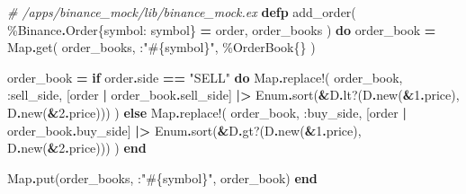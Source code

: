 \documentclass[
  oneside]{book}
\newenvironment{Shaded}{\begin{snugshade}}{\end{snugshade}}
\newcommand{\CommentTok}[1]{\textcolor[rgb]{0.56,0.35,0.01}{\textit{#1}}}
\newcommand{\ConstantTok}[1]{\textcolor[rgb]{0.00,0.00,0.00}{#1}}
\newcommand{\ControlFlowTok}[1]{\textcolor[rgb]{0.13,0.29,0.53}{\textbf{#1}}}
\newcommand{\DecValTok}[1]{\textcolor[rgb]{0.00,0.00,0.81}{#1}}
\newcommand{\KeywordTok}[1]{\textcolor[rgb]{0.13,0.29,0.53}{\textbf{#1}}}
\newcommand{\NormalTok}[1]{#1}
\newcommand{\OperatorTok}[1]{\textcolor[rgb]{0.81,0.36,0.00}{\textbf{#1}}}
\newcommand{\OtherTok}[1]{\textcolor[rgb]{0.56,0.35,0.01}{#1}}
\newcommand{\StringTok}[1]{\textcolor[rgb]{0.31,0.60,0.02}{#1}}
\newcommand{\VariableTok}[1]{\textcolor[rgb]{0.00,0.00,0.00}{#1}}
\begin{document}
\begin{Shaded}
\begin{Highlighting}[]
\CommentTok{\# /apps/binance\_mock/lib/binance\_mock.ex}
  \KeywordTok{defp}\NormalTok{ add\_order(}
\NormalTok{         \%}\ConstantTok{Binance}\OperatorTok{.}\ConstantTok{Order}\NormalTok{\{}\VariableTok{symbol:}\NormalTok{ symbol\} }\OperatorTok{=}\NormalTok{ order,}
\NormalTok{         order\_books}
\NormalTok{       ) }\KeywordTok{do}
\NormalTok{    order\_book }\OperatorTok{=}
      \ConstantTok{Map}\OperatorTok{.}\NormalTok{get(}
\NormalTok{        order\_books,}
\NormalTok{        :}\StringTok{"}\OtherTok{\#\{}\NormalTok{symbol}\OtherTok{\}}\StringTok{"}\NormalTok{,}
\NormalTok{        \%}\ConstantTok{OrderBook}\NormalTok{\{\}}
\NormalTok{      )}

\NormalTok{    order\_book }\OperatorTok{=}
      \ControlFlowTok{if}\NormalTok{ order}\OperatorTok{.}\NormalTok{side }\OperatorTok{==} \StringTok{"SELL"} \KeywordTok{do}
        \ConstantTok{Map}\OperatorTok{.}\NormalTok{replace!(}
\NormalTok{          order\_book,}
          \VariableTok{:sell\_side}\NormalTok{,}
\NormalTok{          [order }\OperatorTok{|}\NormalTok{ order\_book}\OperatorTok{.}\NormalTok{sell\_side]}
          \OperatorTok{|\textgreater{}} \ConstantTok{Enum}\OperatorTok{.}\NormalTok{sort(}\OperatorTok{\&}\NormalTok{D}\OperatorTok{.}\NormalTok{lt?(D}\OperatorTok{.}\NormalTok{new(}\OperatorTok{\&}\DecValTok{1}\OperatorTok{.}\NormalTok{price), D}\OperatorTok{.}\NormalTok{new(}\OperatorTok{\&}\DecValTok{2}\OperatorTok{.}\NormalTok{price)))}
\NormalTok{        )}
      \ControlFlowTok{else}
        \ConstantTok{Map}\OperatorTok{.}\NormalTok{replace!(}
\NormalTok{          order\_book,}
          \VariableTok{:buy\_side}\NormalTok{,}
\NormalTok{          [order }\OperatorTok{|}\NormalTok{ order\_book}\OperatorTok{.}\NormalTok{buy\_side]}
          \OperatorTok{|\textgreater{}} \ConstantTok{Enum}\OperatorTok{.}\NormalTok{sort(}\OperatorTok{\&}\NormalTok{D}\OperatorTok{.}\NormalTok{gt?(D}\OperatorTok{.}\NormalTok{new(}\OperatorTok{\&}\DecValTok{1}\OperatorTok{.}\NormalTok{price), D}\OperatorTok{.}\NormalTok{new(}\OperatorTok{\&}\DecValTok{2}\OperatorTok{.}\NormalTok{price)))}
\NormalTok{        )}
      \KeywordTok{end}

    \ConstantTok{Map}\OperatorTok{.}\NormalTok{put(order\_books, :}\StringTok{"}\OtherTok{\#\{}\NormalTok{symbol}\OtherTok{\}}\StringTok{"}\NormalTok{, order\_book)}
  \KeywordTok{end}
\end{Highlighting}
\end{Shaded}
\end{document}
